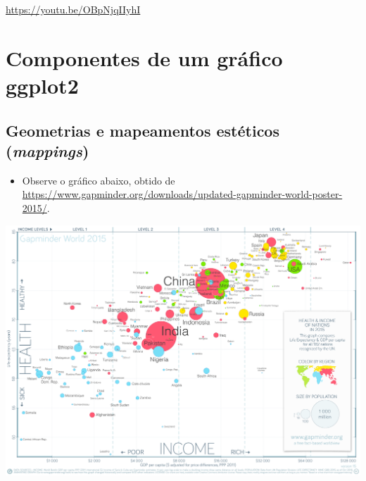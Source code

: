 \documentclass[
  11pt]{report}
\providecommand{\tightlist}{%
  \setlength{\itemsep}{0pt}\setlength{\parskip}{0pt}}
\begin{document}
\begin{center} \url{https://youtu.be/OBpNjqIIyhI} \end{center}

\hypertarget{componentes-de-um-gruxe1fico-ggplot2}{%
\section{Componentes de um gráfico ggplot2}\label{componentes-de-um-gruxe1fico-ggplot2}}

\hypertarget{geometrias-e-mapeamentos-estuxe9ticos-mappings}{%
\subsection{\texorpdfstring{Geometrias e mapeamentos estéticos (\emph{mappings})}{Geometrias e mapeamentos estéticos (mappings)}}\label{geometrias-e-mapeamentos-estuxe9ticos-mappings}}

\begin{itemize}
\tightlist
\item
  Observe o gráfico abaixo, obtido de \url{https://www.gapminder.org/downloads/updated-gapminder-world-poster-2015/}.
\end{itemize}

\begin{center}\includegraphics[width=1\linewidth]{images/countries-1} \end{center}
\end{document}
